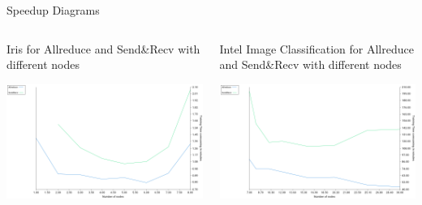\documentclass[presentation]{beamer}
\begin{document}
\begin{frame}[label={sec:org57511c6}]{Speedup Diagrams}
\begin{columns}
\begin{column}{0.6\columnwidth}
\begin{block}{Iris for Allreduce and Send\&Recv with different nodes}
\begin{center}
\includegraphics[width=.9\linewidth]{./png/irisSpendup.png}
\end{center}
\end{block}
\end{column}
\begin{column}{0.6\columnwidth}
\begin{block}{Intel Image Classification for Allreduce and Send\&Recv with different nodes}
\begin{center}
\includegraphics[width=.9\linewidth]{./png/intelImageSpendup.png}
\end{center}
\end{block}
\end{column}
\end{columns}
\end{frame}
\end{document}
